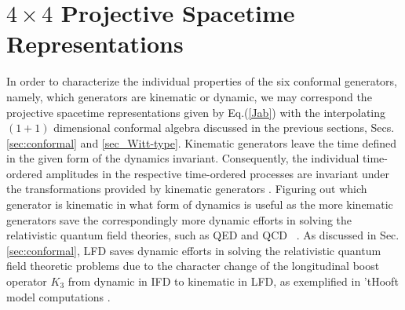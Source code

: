 \documentclass[%
 reprint,
superscriptaddress,
 amsmath,amssymb,
 aps,
]{revtex4-2}
\begin{document}
\section{\texorpdfstring{$4\times4$}{TEXT} Projective Spacetime Representations}
\label{sec:projectivespace}
In order to characterize the individual properties of the six conformal generators, namely, which generators are kinematic or dynamic, we may correspond the projective spacetime representations 
given by Eq.(\ref{Jab}) with
the interpolating $(1+1)$ dimensional conformal algebra
discussed in the previous sections, Secs.\ref{sec:conformal} and \ref{sec_Witt-type}. 
Kinematic generators leave the time defined in the given form of the dynamics invariant.
Consequently, the individual time-ordered amplitudes in the respective time-ordered processes are invariant under the transformations provided by kinematic generators \cite{Ji2001}.
Figuring out which generator is kinematic in what form of dynamics is useful as the more kinematic generators save the correspondingly more dynamic efforts in solving the relativistic quantum field theories, such as QED and QCD~ \cite{ji2023relativistic}. As discussed in Sec.\ref{sec:conformal}, 
LFD saves dynamic efforts in solving the relativistic quantum field theoretic problems due to the character change of the longitudinal boost operator $K_3$ from dynamic in IFD to kinematic in LFD, as exemplified in 'tHooft model computations  \cite{THOOFT1974461, Ji2021QCD, ji2023relativistic}.
\end{document}
